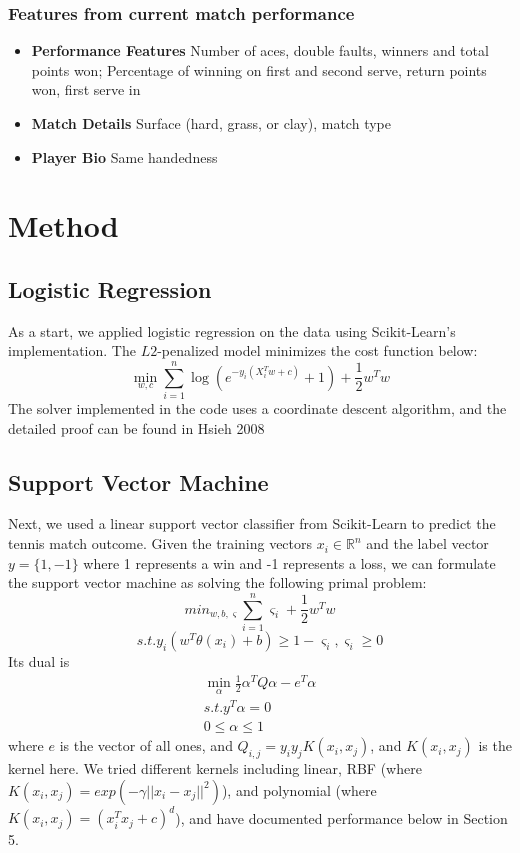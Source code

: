 \documentclass[paper=a4, fontsize=10pt]{scrartcl} %
\numberwithin{equation}{section} %
\numberwithin{figure}{section} %
\numberwithin{table}{section} %
\begin{document}
\subsubsection{Features from current match performance}
\begin{itemize}
\item \textbf{Performance Features} Number of aces, double faults, winners and total points won; Percentage of winning on first and second serve, return points won, first serve in
\item \textbf{Match Details} Surface (hard, grass, or clay), match type
\item \textbf{Player Bio} Same handedness
\end{itemize}

\section{Method}
\subsection{Logistic Regression}
As a start, we applied logistic regression on the data using Scikit-Learn's implementation\cite{scikit-learn}. The $L2$-penalized model minimizes the cost function below: $$\min_{w,c} \sum_{i=1}^n \log(e^{-y_i(X_i^Tw+c)}+1) + \frac{1}{2}w^Tw$$
The solver implemented in the code uses a coordinate descent algorithm, and the detailed proof can be found in Hsieh 2008 \cite{hsieh2008dual}
\subsection{Support Vector Machine}
Next, we used a linear support vector classifier from Scikit-Learn \cite{scikit-learn} to predict the tennis match outcome. Given the training vectors $x_i \in \mathbb{R}^n$ and the label vector $y = \{1,-1\}$ where 1 represents a win and -1 represents a loss, we can formulate the support vector machine as solving the following primal problem: $$min_{w,b, \varsigma} \sum_{i=1}^n \varsigma_i + \frac{1}{2}w^Tw$$ 
$$s.t. y_i(w^T\theta(x_i) + b) \geq 1 - \varsigma_i,    \varsigma_i \geq 0$$
Its dual is \begin{align*}
\min_\alpha \frac{1}{2}\alpha^TQ\alpha - e^T\alpha \\
s.t. y^T \alpha = 0 \\
0 \le \alpha \le 1 
\end{align*}
where $e$ is the vector of all ones, and $Q_{i,j} = y_i y_j K(x_i, x_j)$, and $K(x_i, x_j)$ is the kernel here. We tried different kernels including linear, RBF (where $K(x_i, x_j) = exp(-\gamma||x_i - x_j||^2)$), and polynomial (where $K(x_i, x_j) = (x_i^T x_j + c)^d$), and have documented performance below in Section 5.
\end{document}
